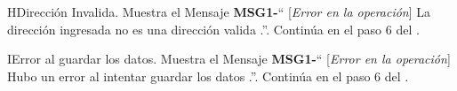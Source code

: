 \begin{UCtrayectoriaA}{H}{Dirección Invalida.}
			\UCpaso Muestra el Mensaje {\bf MSG1-}`` [{\em Error en la operación}] La dirección ingresada no es una dirección valida  .''.
			\UCpaso Continúa en el paso 6 del .
		\end{UCtrayectoriaA}
\begin{UCtrayectoriaA}{I}{Error al guardar los datos.}
			\UCpaso Muestra el Mensaje {\bf MSG1-}`` [{\em Error en la operación}] Hubo un error al intentar guardar los datos .''.
			\UCpaso Continúa en el paso 6 del .
		\end{UCtrayectoriaA}
